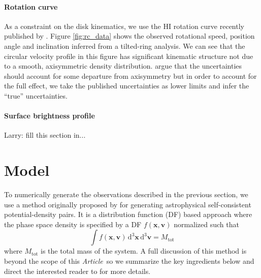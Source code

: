 \documentclass[preprint,12pt]{aastex}
\newcommand{\paper}{\emph{Article}}
\newcommand{\Fig}[1]{Figure \ref{fig:#1}}
\newcommand{\dd}{\,\mathrm{d}}
\newcommand{\bvec}[1]{\ensuremath{\boldsymbol{#1}}}
\renewcommand{\vector}[1]{\ensuremath{\bvec{#1}}}
\newcommand{\df}{f}
\begin{document}
\paragraph{Rotation curve}

As a constraint on the disk kinematics, we use the HI rotation curve
recently published by \citet{Chemin:2009}. \Fig{rc_data}
shows the observed rotational speed, position angle and inclination inferred
from a tilted-ring analysis.  We can see that the circular velocity profile
in this figure has significant kinematic structure not due to a smooth,
axisymmetric density distribution. \citet{Chemin:2009} argue that the
uncertainties should account for some departure from axisymmetry but in
order to account for the full effect, we take the published
uncertainties as lower limits and infer the ``true'' uncertainties.

\paragraph{Surface brightness profile}

Larry: fill this section in...


%
%

\section{Model}

To numerically generate the observations described in the previous section,
we use a method originally proposed by \citet{Kuijken:1995} for generating
astrophysical self-consistent potential-density pairs. It is a
distribution function (DF) based approach where the phase space density
is specified by a DF $\df (\vector{x}, \vector{v})$ normalized such that
\begin{equation}
    \int \df (\vector{x}, \vector{v}) \dd^3 \vector{x}\dd^3 \vector{v}
        = M_\mathrm{tot}
\end{equation}
where $M_\mathrm{tot}$ is the total mass of the system. A full discussion
of this method is beyond the scope of this \paper\ so we summarize the
key ingredients below and direct the interested reader to
\citet{Widrow:2008} for more details.
\end{document}
